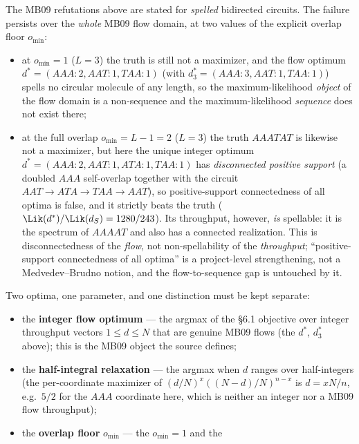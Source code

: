 \begin{remark}
\label{rem:flow-domain}
The MB09 refutations above are stated for \emph{spelled} bidirected circuits.
The failure persists over the \emph{whole} MB09 flow domain, at two values of
the explicit overlap floor $o_{\min}$:
\begin{itemize}
  \item at $o_{\min}=1$ ($L=3$) the truth is still not a maximizer, and the flow
        optimum $d^*=(AAA{:}2,AAT{:}1,TAA{:}1)$ (with
        $d^*_3=(AAA{:}3,AAT{:}1,TAA{:}1)$) spells no circular molecule of any
        length, so the maximum-likelihood \emph{object} of the flow domain is a
        non-sequence and the maximum-likelihood \emph{sequence} does not exist
        there;
  \item at the full overlap $o_{\min}=L-1=2$ ($L=3$) the truth $AAATAT$ is
        likewise not a maximizer, but here the unique integer optimum
        $d^*=(AAA{:}2,AAT{:}1,ATA{:}1,TAA{:}1)$ has \emph{disconnected positive
        support} (a doubled $AAA$ self-overlap together with the circuit
        $AAT\to ATA\to TAA\to AAT$), so positive-support connectedness of all
        optima is false, and it strictly beats the truth
        ($\Lik(d^*)/\Lik(d_S)=1280/243$). Its throughput, however, \emph{is}
        spellable: it is the spectrum of $AAAAT$ and also has a connected
        realization. This is disconnectedness of the \emph{flow}, not
        non-spellability of the \emph{throughput}; ``positive-support
        connectedness of all optima'' is a project-level strengthening, not a
        Medvedev--Brudno notion, and the flow-to-sequence gap is untouched by
        it.
\end{itemize}
Two optima, one parameter, and one distinction must be kept separate:
\begin{itemize}
  \item the \textbf{integer flow optimum} --- the argmax of the §6.1 objective
        over integer throughput vectors $1\le d\le N$ that are genuine MB09 flows
        (the $d^*$, $d^*_3$ above); this is the MB09 object the source
        defines;
  \item the \textbf{half-integral relaxation} --- the argmax when $d$ ranges over
        half-integers (the per-coordinate maximizer of
        $(d/N)^x((N-d)/N)^{n-x}$ is $d=xN/n$, e.g.\ $5/2$ for the $AAA$ coordinate
        here, which is neither an integer nor a MB09 flow throughput);
  \item the \textbf{overlap floor} $o_{\min}$ --- the $o_{\min}=1$ and the

\end{itemize}
\end{remark}
